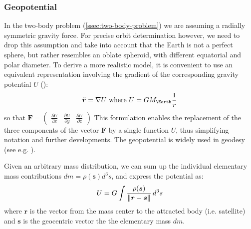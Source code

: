 \subsubsection{Geopotential}
\label{sssec:geopotential}

In the two-body problem (\ref{ssec:two-body-problem}) we are assuming a radially 
symmetric gravity force. For precise orbit determination however, we need to 
drop this assumption and take into account that the Earth is not a perfect sphere, 
but rather resembles an oblate spheroid, with different equatorial and polar 
diameter. To derive a more realistic model, it is convenient to use an equivalent 
representation involving the gradient of the corresponding gravity potential $U$ 
(\cite{Montenbruck2000}):
\begin{equation}
  \label{eq:geopotential}
  \ddot{\bm{r}} = \nabla U \textrm{ where } U = G M_{\Earth} \frac{1}{r}
\end{equation}
so that 
$\bm{F} = \begin{pmatrix} \frac{\partial U}{\partial x} & \frac{\partial U}{\partial y} & \frac{\partial U}{\partial z} \end{pmatrix}$
This formulation enables the replacement of the three components of the vector 
$\bm{F}$ by a single function $U$, thus simplifying notation and further 
developments. The geopotential is widely used in geodesy (see e.g. \cite{moritz}).

Given an arbitrary mass distribution, we can sum up the individual elementary 
mass contributions $dm = \rho (\bm{s}) d^3 s$, and express the potential as:
\begin{equation}
  U = G \int \frac{\rho (\bm{s})}{\lVert\bm{r}-\bm{s}\rVert} \, d^3 s
\end{equation}
where $\bm{r}$ is the vector from the mass center to the attracted body (i.e. satellite) 
and $\bm{s}$ is the geocentric vector the the elementary mass $dm$.

